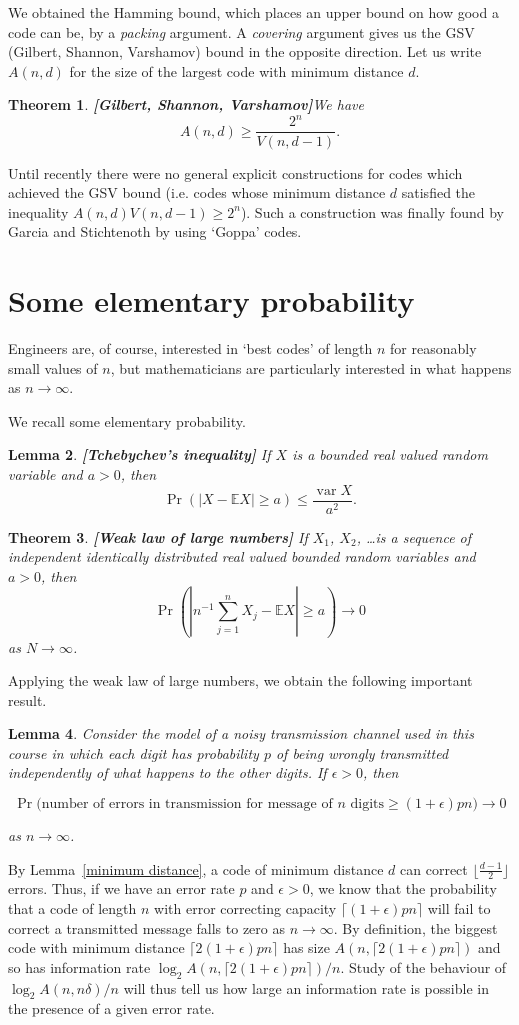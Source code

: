 \documentclass[12pt,a4paper]{article}
\theoremstyle{plain}
\newtheorem{theorem}{Theorem}[section]
\newtheorem{lemma}[theorem]{Lemma}
\theoremstyle{definition}
\newcommand{\Var}{\operatorname{var}}
\begin{document}
We obtained the Hamming bound, which
places an upper bound on how good
a code can be, by a \emph{packing} argument.
A \emph{covering} argument gives
us the GSV (Gilbert, Shannon, Varshamov) bound
in the opposite direction. Let us write
$A(n,d)$ for the size of the largest code
with minimum distance $d$.
\begin{theorem} {\bf [Gilbert, Shannon, Varshamov]}\label{GSV}
We have
\[A(n,d)\geq \frac{2^{n}}{V(n,d-1)}.\]
\end{theorem}
Until recently there were no general explicit
constructions for codes which achieved the
GSV bound (i.e. codes whose minimum distance
$d$ satisfied the inequality $A(n,d)V(n,d-1)\geq 2^{n}$).
Such a construction
was finally found by Garcia and Stichtenoth by
using `Goppa' codes.
\section{Some elementary probability}
Engineers are, of course, interested in `best codes'
of length $n$ for reasonably small values of $n$,
but mathematicians are particularly interested
in what happens as $n\rightarrow\infty$.

We recall some elementary probability.
\begin{lemma} {\bf [Tchebychev's inequality]}
If $X$ is a bounded real valued random variable
and $a>0$, then
\[\Pr(|X-{\mathbb E}X|\geq a)\leq\frac{\Var X}{a^{2}}.\]
\end{lemma}
\begin{theorem} {\bf [Weak law of large numbers]}
If $X_{1}$, $X_{2}$, \dots is a sequence of independent
identically distributed real valued bounded
random variables and $a>0$, then
\[\Pr\left(\left|n^{-1}\sum_{j=1}^{n}X_{j}
-{\mathbb E}X\right|\geq a\right)\rightarrow 0\]
as $N\rightarrow\infty$.
\end{theorem}
Applying the weak law of large numbers,
we obtain the following important result.
\begin{lemma} Consider the model of a noisy transmission
channel used in this course in which each digit
has probability $p$ of being wrongly transmitted
independently of what happens to the other digits.
If $\epsilon>0$, then
\begin{small}
\[\Pr\big(\text{number of errors in transmission for
message of $n$ digits}\geq (1+\epsilon)pn\big) \rightarrow 0\]
\end{small}
as $n\rightarrow\infty$.
\end{lemma}
By
Lemma~\ref{minimum distance},
a code of minimum distance
$d$ can correct
$\lfloor\frac{d-1}{2}\rfloor$ errors.
Thus, if we have an error rate $p$
and $\epsilon>0$, we know that
the probability that a
code of length $n$ with error correcting capacity
$\lceil (1+\epsilon)pn\rceil$
will fail to correct a transmitted message
falls to zero as $n\rightarrow\infty$.
By definition, the biggest code with
minimum distance $\lceil 2(1+\epsilon)pn \rceil$
has size $A(n,\lceil 2(1+\epsilon)pn \rceil)$
and so has information rate
$\log_{2}A(n,\lceil 2(1+\epsilon)pn \rceil)/n$.
Study of the behaviour of $\log_{2}A(n,n\delta)/n$
will thus tell us how large an information
rate is possible in the presence of a given error
rate.
\end{document}

